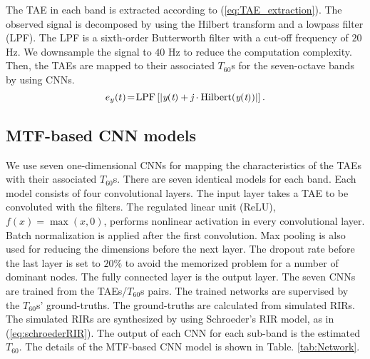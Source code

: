 \documentclass[conference]{IEEEtran}
\begin{document}
	The TAE in each band is extracted according to (\ref{eq:TAE_extraction}). The observed signal is decomposed by using the Hilbert transform and a lowpass filter (LPF). The LPF is a sixth-order Butterworth filter with a cut-off frequency of $20$ Hz. We downsample the signal to $40$ Hz to reduce the computation complexity. Then, the TAEs are mapped to their associated $T_{60}$s for the seven-octave bands by using CNNs.
	\begin{equation}
		{{e}_y(t)}\!=\!\rm{LPF}\,[|\textit{y}(\textit{t})+\textit{j}\cdot{\rm{Hilbert}}(\textit{y}(\textit{t}))|]\,.  
		\label{eq:TAE_extraction}
	\end{equation} 
	\subsection{MTF-based CNN models}
	We use seven one-dimensional CNNs for mapping the characteristics of the TAEs with their associated $T_{60}$s. There are seven identical models for each band. Each model consists of four convolutional layers. The input layer takes a TAE to be convoluted with the filters. The regulated linear unit (ReLU), $f(x)\!=\!\max(x,0)$, performs nonlinear activation in every convolutional layer. Batch normalization is applied after the first convolution. Max pooling is also used for reducing the dimensions before the next layer. The dropout rate before the last layer is set to $20\%$ to avoid the memorized problem for a number of dominant nodes. The fully connected layer is the output layer. The seven CNNs are trained from the TAEs/$T_{60}$s pairs. The trained networks are supervised by the $T_{60}$s' ground-truths. The ground-truths are calculated from simulated RIRs. The simulated RIRs are synthesized by using Schroeder's RIR model, as in (\ref{eq:schroederRIR}). The output of each CNN for each sub-band is the estimated $T_{60}$. The details of the MTF-based CNN model is shown in Table. \ref{tab:Network}.
	
\end{document}
